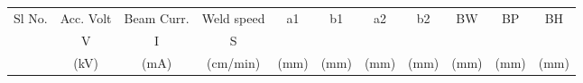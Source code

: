 \begin{landscape}
 \\ \\


\begin{table}[h]
\begin{center} 
\vspace{-20 pt}
\begin{tabular}{l c c c c c c c c c c}
\hline
{Sl No.}&{Acc. Volt}&{Beam Curr.}&{Weld speed}&{a1}&{b1}&{a2}&{b2}&{BW}&{BP}&{BH}\\
{}&{V}&{I}&{S}&{}&{}&{}&{}&{}&{}&{}\\
{}&{(kV)}&{(mA)}&{(cm/min)}&{(mm)}&{(mm)}&{(mm)}&{(mm)}&{(mm)}&{(mm)}&{(mm)}\\\hline


\end{tabular}
\end{center}
\end{table}
\end{landscape}
